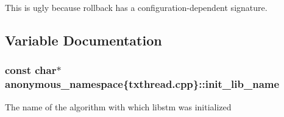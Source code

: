 This is ugly because rollback has a configuration-\/dependent signature. 

\subsection{Variable Documentation}
\hypertarget{namespaceanonymous__namespace_02txthread_8cpp_03_a48fac128b632fd74dfb62133fb88dd18}{
\subsubsection[{init\-\_\-lib\-\_\-name}]{\setlength{\rightskip}{0pt plus 5cm}const char$\ast$ anonymous\-\_\-namespace\{txthread.\-cpp\}\-::init\-\_\-lib\-\_\-name}}\label{namespaceanonymous__namespace_02txthread_8cpp_03_a48fac128b632fd74dfb62133fb88dd18}
The name of the algorithm with which libstm was initialized 